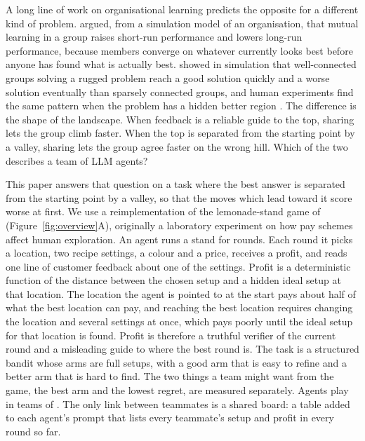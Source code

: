 A long line of work on organisational learning predicts the opposite for a different kind of problem.
\citet{march1991exploration} argued, from a simulation model of an organisation, that mutual learning in a group
raises short-run performance and lowers long-run performance, because members converge on whatever currently looks best before anyone has found
what is actually best. \citet{lazer2007network} showed in simulation that well-connected groups solving a
rugged problem reach a good solution quickly and a worse solution eventually than sparsely connected groups,
and human experiments find the same pattern when the problem has a hidden better region
\citep{mason2012collaborative,derex2016partial}. The difference is the shape of the landscape. When feedback
is a reliable guide to the top, sharing lets the group climb faster. When the top is separated from the
starting point by a valley, sharing lets the group agree faster on the wrong hill. Which of the two describes
a team of LLM agents?

This paper answers that question on a task where the best answer is separated from the starting point by a
valley, so that the moves which lead toward it score worse at first. We use a reimplementation of
the lemonade-stand game of \citet{ederer2013pay} (Figure~\ref{fig:overview}A), originally a laboratory experiment on how pay schemes affect
human exploration. An agent runs a stand for \NRounds{} rounds. Each round it picks a location, two recipe
settings, a colour and a price, receives a profit, and reads one line of customer feedback about one of the
settings. Profit is a deterministic function of the distance between the chosen setup and a hidden ideal
setup at that location. The location the agent is pointed to at the start pays about half of what the best
location can pay, and reaching the best location requires changing the location and several settings at once,
which pays poorly until the ideal setup for that location is found. Profit is therefore a truthful verifier of the current round
and a misleading guide to where the best round is. The task is a structured bandit whose arms are full setups,
with a good arm that is easy to refine and a better arm that is hard to find. The two things a team might want
from the game, the best arm and the lowest regret, are measured separately. Agents play in teams of
\NAgents{}. The only link between teammates is a shared board: a table added to each agent's prompt that lists
every teammate's setup and profit in every round so far.


